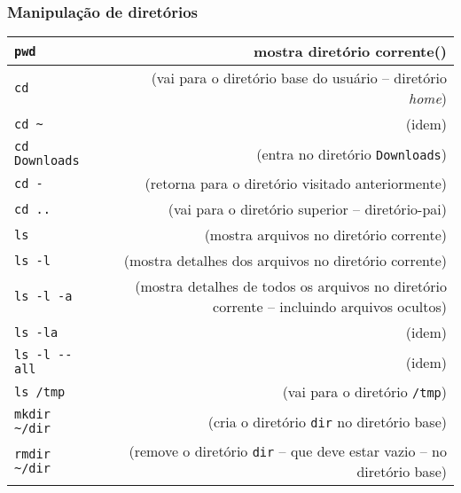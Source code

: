 \documentclass[aspectratio=169]{beamer}
\begin{document}
\begin{frame}\frametitle{Manipulação de diretórios}
\begin{tabular}{lp{2cm}r}
\texttt{pwd} & & \tiny{mostra diretório corrente()}\\\hline
\texttt{cd} & & \tiny{(vai para o diretório base do usuário -- diretório \emph{home})}\\\hline
\texttt{cd \~{}} & & \tiny{(idem)}\\\hline
\texttt{cd Downloads} & & \tiny{(entra no diretório \texttt{Downloads})}\\\hline
\texttt{cd -} & & \tiny{(retorna para o diretório visitado anteriormente)}\\\hline
\texttt{cd ..} & & \tiny{(vai para o diretório superior -- diretório-pai)}\\\hline
\texttt{ls} & & \tiny{(mostra arquivos no diretório corrente)}\\\hline
\texttt{ls -l} & & \tiny{(mostra detalhes dos arquivos no diretório corrente)}\\\hline
\texttt{ls -l -a} & & \tiny{(mostra detalhes de todos os arquivos no diretório corrente -- incluindo arquivos ocultos)}\\\hline
\texttt{ls -la} & & \tiny{(idem)}\\\hline
\texttt{ls -l -{}-all} & & \tiny{(idem)}\\\hline
\texttt{ls /tmp} & & \tiny{(vai para o diretório \texttt{/tmp})}\\\hline
\texttt{mkdir \~{}/dir} & & \tiny{(cria o diretório \texttt{dir} no diretório base)}\\\hline
\texttt{rmdir \~{}/dir} & & \tiny{(remove o diretório \texttt{dir} -- que deve estar vazio -- no diretório base)}\\
\end{tabular}
\end{frame}
\end{document}
